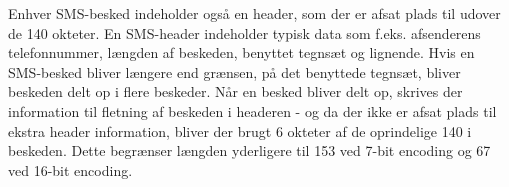 Enhver SMS-besked indeholder også en header\cite{sms_pdu}, som der er afsat plads til udover de 140 okteter. En SMS-header indeholder typisk data som f.eks. afsenderens telefonnummer, længden af beskeden, benyttet tegnsæt og lignende. Hvis en SMS-besked bliver længere end grænsen, på det benyttede tegnsæt, bliver beskeden delt op i flere beskeder. Når en besked bliver delt op, skrives der information til fletning af beskeden i headeren - og da der ikke er afsat plads til ekstra header information, bliver der brugt 6 okteter af de oprindelige 140 i beskeden. Dette begrænser længden yderligere til 153 ved 7-bit encoding og 67 ved 16-bit encoding. 
